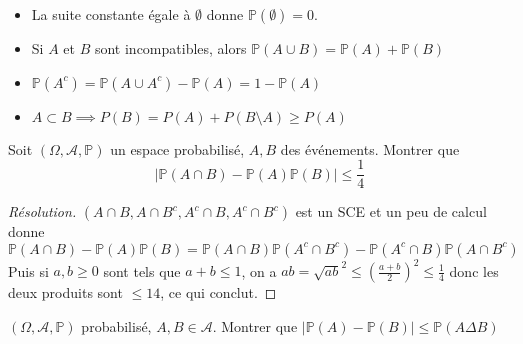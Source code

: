 \begin{rem}
    \begin{itemize}
        \item La suite constante égale à $\emptyset$ donne $\mathbb P(\emptyset)=0$.
        \item Si $A$ et $B$ sont incompatibles, alors $\mathbb P(A\cup B)=\mathbb P(A)+\mathbb P(B)$ 
        \item $\mathbb P(A^c)=\mathbb P(A\cup A^c)-\mathbb P(A)=1-\mathbb P(A)$
        \item $A\subset B \implies P(B)=P(A)+P(B\setminus A)\geq P(A)$
    \end{itemize}
\end{rem}

\begin{exo}
    Soit $(\Omega, \mathcal A, \mathbb P)$ un espace probabilisé, $A, B$ des événements. Montrer que \[
        |\mathbb P(A\cap B)-\mathbb P(A)\mathbb P(B)|\leq \frac{1}{4}
    \]
\end{exo}

\begin{proof}[Résolution]
    $(A\cap B, A\cap B^c, A^c\cap B, A^c\cap B^c)$ est un SCE et un peu de calcul donne \[
        \mathbb P(A\cap B)-\mathbb P(A)\mathbb P(B)=\mathbb P(A\cap B)\mathbb P(A^c\cap B^c)-\mathbb P(A^c\cap B)\mathbb P(A\cap B^c)
    \]
    Puis si $a,b\geq 0$ sont tels que $a+b\leq 1$, on a $ab=\sqrt{ab}^2\leq \left( \frac{a+b}{2} \right) ^2\leq \frac{1}{4}$ donc les deux produits sont $\leq 14$, ce qui conclut.
\end{proof}

\begin{exo}
    $(\Omega, \mathcal A, \mathbb P)$ probabilisé, $A, B \in \mathcal A$. Montrer que $|\mathbb P(A)-\mathbb P(B)| \leq \mathbb P(A\Delta B)$
\end{exo}
